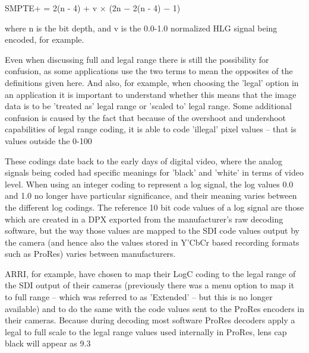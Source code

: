 	SMPTE+ = 2(n - 4) +  v × (2n − 2(n - 4) − 1)

where n is the bit depth, and v is the 0.0-1.0 normalized HLG signal being encoded, for example.

Even when discussing full and legal range there is still the possibility for confusion, as some applications use the two terms to mean the opposites of the definitions given here. And also, for example, when choosing the 'legal' option in an application it is important to understand whether this means that the image data is to be 'treated as' legal range or 'scaled to' legal range. Some additional confusion is caused by the fact that because of the overshoot and undershoot capabilities of legal range coding, it is able to code 'illegal' pixel values – that is values outside the 0-100%

These codings date back to the early days of digital video, where the analog signals being coded had specific meanings for 'black' and 'white' in terms of video level. When using an integer coding to represent a log signal, the log values 0.0 and 1.0 no longer have particular significance, and their meaning varies between the different log codings. The reference 10 bit code values of a log signal are those which are created in a DPX exported from the manufacturer’s raw decoding software, but the way those values are mapped to the SDI code values output by the camera (and hence also the values stored in Y’CbCr based recording formats such as ProRes) varies between manufacturers.

ARRI, for example, have chosen to map their LogC coding to the legal range of the SDI output of their cameras (previously there was a menu option to map it to full range – which was referred to as 'Extended' – but this is no longer available) and to do the same with the code values sent to the ProRes encoders in their cameras. Because during decoding most software ProRes decoders apply a legal to full scale to the legal range values used internally in ProRes, lens cap black will appear as 9.3%



